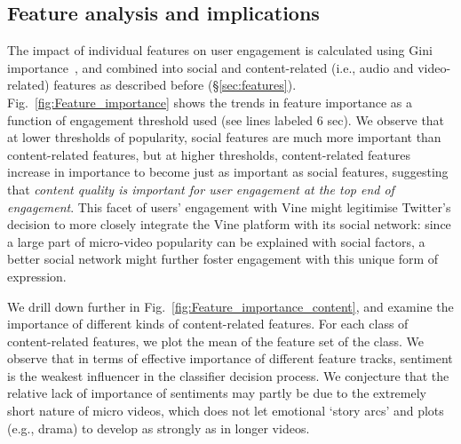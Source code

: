 \subsection{Feature analysis and implications}
The impact of individual features on user engagement is calculated using Gini importance~\cite{louppe2013understanding}, and combined into social  and content-related (i.e., audio and video-related) features as described before (\S\ref{sec:features}). Fig.~\ref{fig:Feature_importance} shows the trends in  feature importance as a function of engagement threshold used (see lines labeled 6 sec). We observe that at lower thresholds of popularity, social features are much more important than content-related features, but at higher thresholds, content-related features increase in importance to become just as important as social features, suggesting that \emph{content quality is important for user engagement at the top end of engagement}. This facet of users' engagement with Vine might legitimise Twitter's decision to more closely integrate the Vine platform with its social network: since a large part of micro-video popularity can be explained with social factors, a better social network might further foster engagement with this unique form of expression. %

We drill down further in Fig.~\ref{fig:Feature_importance_content}, and examine the importance of different kinds of content-related features. For each class of content-related features, we plot the mean of the feature set of the class. We observe that in terms of effective importance of different feature tracks, sentiment is the weakest influencer in the classifier decision process. We conjecture that the relative lack of importance of sentiments may partly be due to the extremely short nature of micro videos, which does not let emotional `story arcs' and plots (e.g., drama) to develop as strongly as in longer videos.


